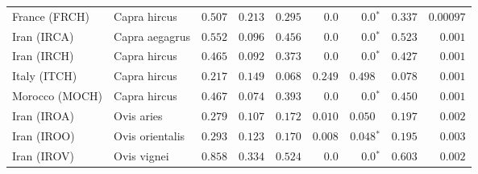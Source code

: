 \begin{center}
\begin{adjustbox}{width = 1\textwidth}
\begin{tabular}{|l|l|r|r|r|r|r|r|r|}
                  France (FRCH) &         Capra hircus &                                        $ 0.507$ &                                           $ 0.213$ &                      $ 0.295$ &            $0.0$ &                  $\bm{0.0{^*}}$ &                                           $ 0.337$ &          $0.00097$ \\
                    Iran (IRCA) &       Capra aegagrus &                                        $ 0.552$ &                                           $ 0.096$ &                      $ 0.456$ &            $0.0$ &                  $\bm{0.0{^*}}$ &                                           $ 0.523$ &           $ 0.001$ \\
                    Iran (IRCH) &         Capra hircus &                                        $ 0.465$ &                                           $ 0.092$ &                      $ 0.373$ &            $0.0$ &                  $\bm{0.0{^*}}$ &                                           $ 0.427$ &           $ 0.001$ \\
                   Italy (ITCH) &         Capra hircus &                                        $ 0.217$ &                                           $ 0.149$ &                      $ 0.068$ &         $ 0.249$ &                      $ 0.498~~$ &                                           $ 0.078$ &           $ 0.001$ \\
                 Morocco (MOCH) &         Capra hircus &                                        $ 0.467$ &                                           $ 0.074$ &                      $ 0.393$ &            $0.0$ &                  $\bm{0.0{^*}}$ &                                           $ 0.450$ &           $ 0.001$ \\
                    Iran (IROA) &           Ovis aries &                                        $ 0.279$ &                                           $ 0.107$ &                      $ 0.172$ &         $ 0.010$ &                      $ 0.050~~$ &                                           $ 0.197$ &           $ 0.002$ \\
                    Iran (IROO) &      Ovis orientalis &                                        $ 0.293$ &                                           $ 0.123$ &                      $ 0.170$ &         $ 0.008$ &               $\bm{ 0.048{^*}}$ &                                           $ 0.195$ &           $ 0.003$ \\
                    Iran (IROV) &          Ovis vignei &                                        $ 0.858$ &                                           $ 0.334$ &                      $ 0.524$ &            $0.0$ &                  $\bm{0.0{^*}}$ &                                           $ 0.603$ &           $ 0.002$ \\

\end{tabular}
\end{adjustbox}
\end{center}
